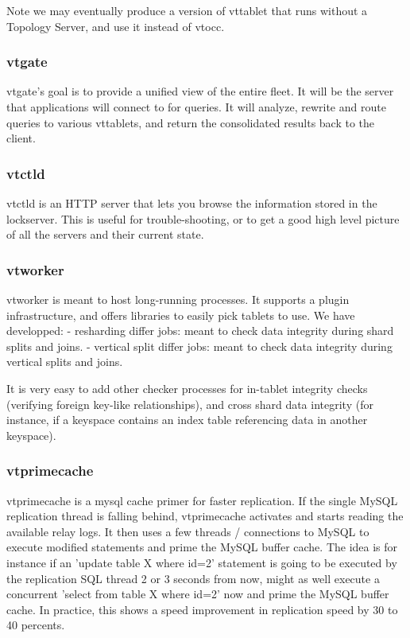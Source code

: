 Note we may eventually produce a version of vttablet that runs
without a Topology Server, and use it instead of vtocc.

\subsubsection{vtgate}\hypertarget{vtgate}{}\label{vtgate}

vtgate's goal is to provide a unified view of the entire fleet.
It will be the server that applications will connect to for
queries. It will analyze, rewrite and route queries to various
vttablets, and return the consolidated results back to the client.

\subsubsection{vtctld}\hypertarget{vtctld}{}\label{vtctld}

vtctld is an HTTP server that lets you browse the information stored
in the lockserver.
This is useful for trouble-shooting, or to get a good high
level picture of all the servers and their current state.

\subsubsection{vtworker}\hypertarget{vtworker}{}\label{vtworker}

vtworker is meant to host long-running processes. It supports a plugin infrastructure, and offers libraries to easily pick tablets to use. We have developped:
- resharding differ jobs: meant to check data integrity during shard splits and joins.
- vertical split differ jobs: meant to check data integrity during vertical splits and joins.

It is very easy to add other checker processes for in-tablet integrity checks (verifying foreign key-like relationships), and cross shard data integrity (for instance, if a keyspace contains an index table referencing data in another keyspace).

\subsubsection{vtprimecache}\hypertarget{vtprimecache}{}\label{vtprimecache}

vtprimecache is a mysql cache primer for faster replication. If the single MySQL replication thread is falling behind, vtprimecache activates and starts reading the available relay logs. It then uses a few threads / connections to MySQL to execute modified statements and prime the MySQL buffer cache. The idea is for instance if an 'update table X where id=2' statement is going to be executed by the replication SQL thread 2 or 3 seconds from now, might as well execute a concurrent 'select from table X where id=2' now and prime the MySQL buffer cache. In practice, this shows a speed improvement in replication speed by 30 to 40 percents.

